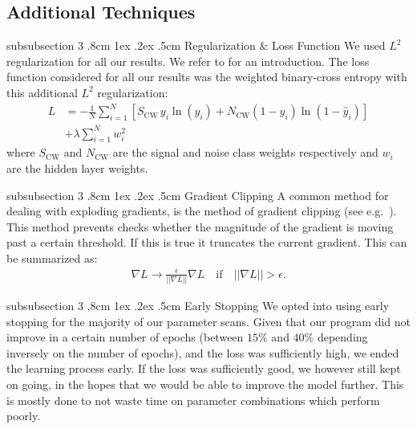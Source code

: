 \documentclass[%
reprint,
amsmath,amssymb,
aps,
]{revtex4-2}
\makeatletter
\renewcommand{\subsubsection}{%
	\@startsection
	{subsubsection}%
	{3}%
	{\z@}%
	{.8cm \@plus1ex \@minus .2ex}%
	{.5cm}%
	{\normalfont\small\centering}%
}
\makeatother
\begin{document}
\subsection{Additional Techniques}
\subsubsection{Regularization \& Loss Function}
We used $L^2$ regularization for all our results. We refer to \cite{project1} for an introduction. The loss function considered for all our results was the weighted binary-cross entropy with this additional $L^2$ regularization:
\begin{align}	
	L&=-\frac1N\sum_{i=1}^N\left[S_{\text{CW}}\,y_i\ln(\hat{y}_i)+N_{\text{CW}}(1-y_i)\ln(1-\hat{y}_i)\right]\nonumber\\
	&+\lambda\sum_{i=1}^Nw_i^2 \label{eq:L2_paramater}
\end{align}
where $S_{\text{CW}}$ and $N_{\text{CW}}$ are the signal and noise class weights respectively and $w_i$ are the hidden layer weights.

\subsubsection{Gradient Clipping}
A common method for dealing with exploding gradients, is the method of gradient clipping (see e.g.~\cite{Goodfellow-et-al-2016}). This method prevents checks whether the magnitude of the gradient is moving past a certain threshold. If this is true it truncates the current gradient. This can be summarized as:
\begin{align}	\label{eq:clipping}
	\nabla L \rightarrow \frac{\epsilon}{||\nabla L||}\nabla L\quad\text{if}\quad||\nabla L|| > \epsilon.
\end{align}

\subsubsection{Early Stopping}
We opted into using early stopping for the majority of our parameter scans. Given that our program did not improve in a certain number of epochs (between $15\%$ and $40\%$ depending inversely on the number of epochs), and the loss was sufficiently high, we ended the learning process early. If the loss was sufficiently good, we however still kept on going, in the hopes that we would be able to improve the model further. This is mostly done to not waste time on parameter combinations which perform poorly. 
\end{document}

